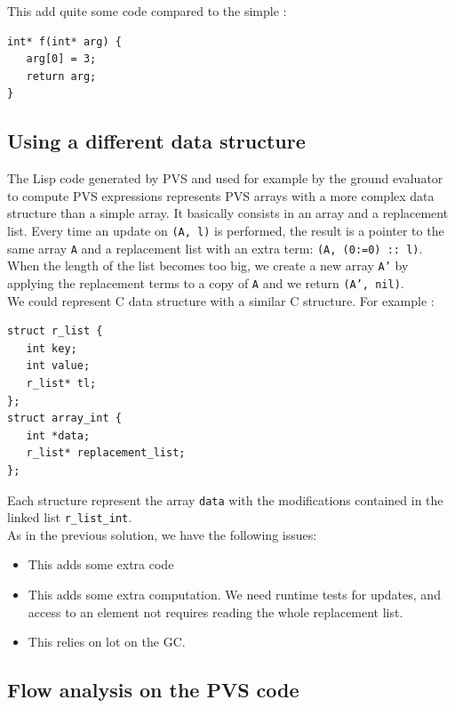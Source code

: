 \documentclass[12pt,a4paper,titlepage]{article}
\newcommand{\cl}[1]{\texttt{#1}}
\begin{document}
This add quite some code compared to the simple :

\begin{lstlisting}
int* f(int* arg) {
   arg[0] = 3;
   return arg;
}
\end{lstlisting}




\subsection{Using a different data structure}

The Lisp code generated by PVS and used for example by the ground evaluator to compute PVS expressions represents PVS arrays with a more complex data structure than a simple array. It basically consists in an array and a replacement list. Every time an update on \cl{(A, l)} is performed, the result is a pointer to the same array \cl{A} and a replacement list with an extra term: \cl{(A, (0:=0) :: l)}. When the length of the list becomes too big, we create a new array \cl{A'} by applying the replacement terms to a copy of \cl{A} and we return \cl{(A', nil)}.\\

We could represent C data structure with a similar C structure. For example :
\begin{lstlisting}
struct r_list {
   int key;
   int value;
   r_list* tl;
};
struct array_int {
   int *data;
   r_list* replacement_list;
};
\end{lstlisting}

Each structure represent the array \cl{data} with the modifications contained in the linked list \cl{r\_list\_int}.\\

As in the previous solution, we have the following issues:
\begin{itemize}
\item This adds some extra code
\item This adds some extra computation. We need runtime tests for updates, and access to an element not requires reading the whole replacement list.
\item This relies on lot on the GC.
\end{itemize}


\subsection{Flow analysis on the PVS code}
\end{document}
